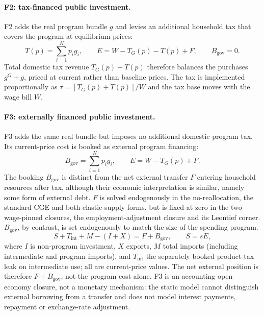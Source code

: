 \paragraph{F2: tax-financed public investment.}
F2 adds the real program bundle $g$ and levies an additional household
tax that covers the program at equilibrium prices:
\begin{equation}
T(p) = \sum_{i=1}^N p_i g_i,
\qquad E = W-T_G(p)-T(p)+F,
\qquad B_{\mathrm{gov}}=0.
\label{eq:closure-f2}
\end{equation}
Total domestic tax revenue $T_G(p)+T(p)$ therefore balances the purchases
$g^G+g$, priced at current rather than baseline prices. The tax is
implemented proportionally as $\tau=[T_G(p)+T(p)]/W$ and the tax base moves with the wage bill $W$.

\paragraph{F3: externally financed public investment.}
F3 adds the same real bundle but imposes no additional domestic program
tax. Its current-price cost is booked as external program financing:
\begin{equation}
B_{\mathrm{gov}} = \sum_{i=1}^N p_i g_i,
\qquad E = W-T_G(p)+F.
\label{eq:closure-f3}
\end{equation}
The booking $B_{\mathrm{gov}}$ is distinct from the net external transfer
$F$ entering household resources after tax, although their economic interpretation is similar, namely some form of external debt. $F$ is solved endogenously in the no-reallocation, the standard CGE and both elastic-supply forms, but is fixed at zero in the two wage-pinned closures, the employment-adjustment closure and its Leontief corner. $B_{\mathrm{gov}}$, by contrast, is set endogenously to match the size of the
spending program.
\begin{equation}
S + T_{\mathrm{int}} + M - (I+X) = F+B_{\mathrm{gov}},
\qquad S=sE,
\label{eq:financing-external-account}
\end{equation}
where $I$ is non-program investment, $X$ exports, $M$ total imports
(including intermediate and program imports), and $T_{\mathrm{int}}$
the separately booked product-tax leak on intermediate use; all are
current-price values. The net external position is therefore $F+B_{\mathrm{gov}}$, not the program
cost alone. F3 is an accounting open-economy closure, not a monetary mechanism: the static model cannot distinguish external borrowing from a transfer and does not model interest payments, repayment or exchange-rate adjustment.

